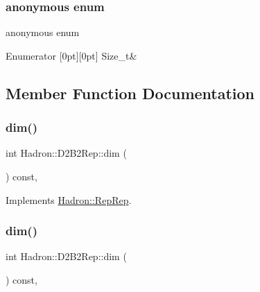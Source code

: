 \subsubsection{\texorpdfstring{anonymous enum}{anonymous enum}}
{\footnotesize\ttfamily anonymous enum}

\begin{DoxyEnumFields}{Enumerator}
[0pt][0pt]{}\mbox{\label{structHadron_1_1D2B2Rep_a3c9934b26c3e1454d6011bd9650bdc17a686ca508d5a011ad0370158b1acb63bb}} 
Size\+\_\+t&\\
\hline

\end{DoxyEnumFields}


\subsection{Member Function Documentation}
\mbox{\label{structHadron_1_1D2B2Rep_a3b51f6989d504745873697ad4dfde43b}} 
\subsubsection{\texorpdfstring{dim()}{dim()}\hspace{0.1cm}{\footnotesize\ttfamily [1/5]}}
{\footnotesize\ttfamily int Hadron\+::\+D2\+B2\+Rep\+::dim (\begin{DoxyParamCaption}{ }\end{DoxyParamCaption}) const\hspace{0.3cm}{\ttfamily [inline]}, {\ttfamily [virtual]}}



Implements \mbox{\hyperlink{structHadron_1_1RepRep_a92c8802e5ed7afd7da43ccfd5b7cd92b}{Hadron\+::\+Rep\+Rep}}.

\mbox{\label{structHadron_1_1D2B2Rep_a3b51f6989d504745873697ad4dfde43b}} 
\subsubsection{\texorpdfstring{dim()}{dim()}\hspace{0.1cm}{\footnotesize\ttfamily [2/5]}}
{\footnotesize\ttfamily int Hadron\+::\+D2\+B2\+Rep\+::dim (\begin{DoxyParamCaption}{ }\end{DoxyParamCaption}) const\hspace{0.3cm}{\ttfamily [inline]}, {\ttfamily [virtual]}}




